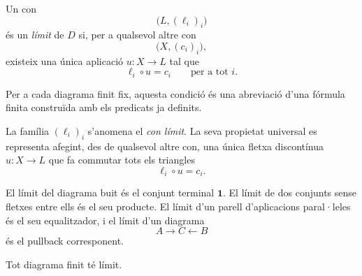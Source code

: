 \begin{definicio}[Límit]\label{def:limit}
Un con
\[
\bigl(L,(\ell_i)_i\bigr)
\]
és un \emph{límit} de \(D\) si, per a qualsevol altre con
\[
\bigl(X,(c_i)_i\bigr),
\]
existeix una única aplicació \(u:X\to L\) tal que
\[
\ell_i\circ u=c_i
\qquad\text{per a tot }i.
\]

Per a cada diagrama finit fix, aquesta condició és una abreviació d'una fórmula finita construïda amb els predicats ja definits.
\end{definicio}

\begin{notacio}\label{not:limit}
La família \((\ell_i)_i\) s'anomena el \emph{con límit}. La seva propietat universal es representa afegint, des de qualsevol altre con, una única fletxa discontínua \(u:X\to L\) que fa commutar tots els triangles
\[
\ell_i\circ u=c_i.
\]
\end{notacio}

\begin{observacio}\label{obs:limits-casos}
El límit del diagrama buit és el conjunt terminal \(\mathbf1\). El límit de dos conjunts sense fletxes entre ells és el seu producte. El límit d'un parell d'aplicacions paral·leles és el seu equalitzador, i el límit d'un diagrama
\[
A\longrightarrow C\longleftarrow B
\]
és el pullback corresponent.
\end{observacio}

\begin{teorema}\label{teo:limits-finits}
Tot diagrama finit té límit.
\end{teorema}

